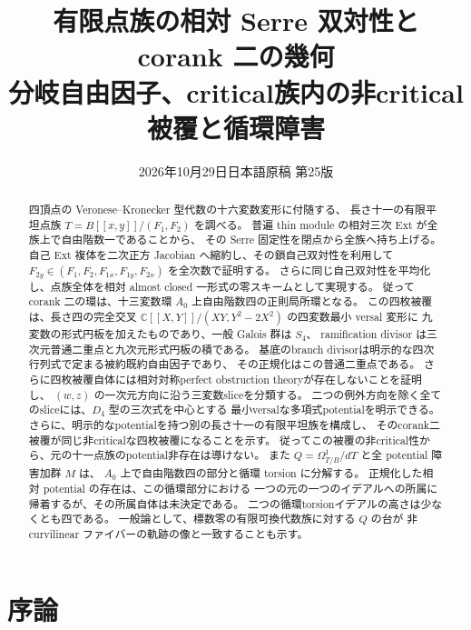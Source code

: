 
\newcommand{\Fitt}{\operatorname{Fitt}}
\newcommand{\Nm}{\operatorname{Nm}}
\title{有限点族の相対 Serre 双対性と corank 二の幾何\\
\large 分岐自由因子、critical族内の非critical被覆と循環障害}
\author{}\date{2026年10月29日\quad 日本語原稿 第25版}

\maketitle
\begin{abstract}
四頂点の Veronese--Kronecker 型代数の十六変数変形に付随する、
長さ十一の有限平坦点族 $T=B[[x,y]]/(F_1,F_2)$ を調べる。
普遍 thin module の相対三次 Ext が全族上で自由階数一であることから、
その Serre 固定性を閉点から全族へ持ち上げる。
自己 Ext 複体を二次正方 Jacobian へ縮約し、その鎖自己双対性を利用して
$F_{2y}\in(F_1,F_2,F_{1x},F_{1y},F_{2x})$ を全次数で証明する。
さらに同じ自己双対性を平均化し、点族全体を相対 almost closed 一形式の零スキームとして実現する。
従って corank 二の環は、十三変数環 $A_0$ 上自由階数四の正則局所環となる。
この四枚被覆は、長さ四の完全交叉
$\mathbb C[[X,Y]]/(XY,Y^2-2X^2)$ の四変数最小 versal 変形に
九変数の形式円板を加えたものであり、一般 Galois 群は $S_4$、
ramification divisor は三次元普通二重点と九次元形式円板の積である。
基底のbranch divisorは明示的な四次行列式で定まる被約既約自由因子であり、
その正規化はこの普通二重点である。
さらに四枚被覆自体には相対対称perfect obstruction theoryが存在しないことを証明し、
$(w,z)$ の一次元方向に沿う三変数sliceを分類する。
二つの例外方向を除く全てのsliceには、$D_4$ 型の三次式を中心とする
最小versalな多項式potentialを明示できる。
さらに、明示的なpotentialを持つ別の長さ十一の有限平坦族を構成し、
そのcorank二被覆が同じ非criticalな四枚被覆になることを示す。
従ってこの被覆の非critical性から、元の十一点族のpotential非存在は導けない。
また $Q=\Omega^1_{T/B}/dT$ と全 potential 障害加群 $M$ は、
$A_0$ 上で自由階数四の部分と循環 torsion に分解する。
正規化した相対 potential の存在は、この循環部分における
一つの元の一つのイデアルへの所属に帰着するが、その所属自体は未決定である。
二つの循環torsionイデアルの高さは少なくとも四である。
一般論として、標数零の有限可換代数族に対する $Q$ の台が
非 curvilinear ファイバーの軌跡の像と一致することも示す。
\end{abstract}
\tableofcontents

\section{序論}

